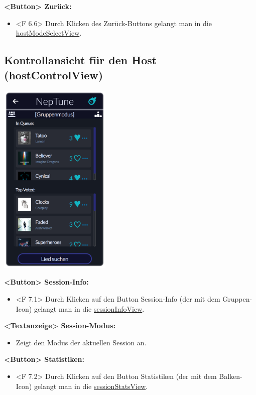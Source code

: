 \documentclass[oneside, ngerman]{sdqtechreport}
\begin{document}
\textbf{<Button> Zurück:}
\begin{itemize}
    \item <F 6.6> Durch Klicken des Zurück-Buttons gelangt man in die  \hyperlink{hostModeSelectView}{hostModeSelectView}.
\end{itemize}



\subsection{Kontrollansicht für den Host (hostControlView)}
\label{sec:Benutzeroberfläche:hostControlView}

\begin{center}
    \hypertarget{hostControlView}{}
    \includegraphics[width=0.4\textwidth]{LATEX/Pflichtenheft/GraphicDesigns/hostControlPage.png}
\end{center}

\textbf{<Button> Session-Info:}
\begin{itemize}
    \item <F 7.1> Durch Klicken auf den Button Session-Info (der mit dem Gruppen-Icon) gelangt man in die \hyperlink{sessionInfoView}{sessionInfoView}.
\end{itemize}

\textbf{<Textanzeige> Session-Modus:}
\begin{itemize}
    \item Zeigt den Modus der aktuellen Session an.
\end{itemize}

\textbf{<Button> Statistiken:}
\begin{itemize}
    \item <F 7.2> Durch Klicken auf den Button Statistiken (der mit dem Balken-Icon) gelangt man in die \hyperlink{sessionStatsView}{sessionStatsView}.
\end{itemize}
\end{document}
